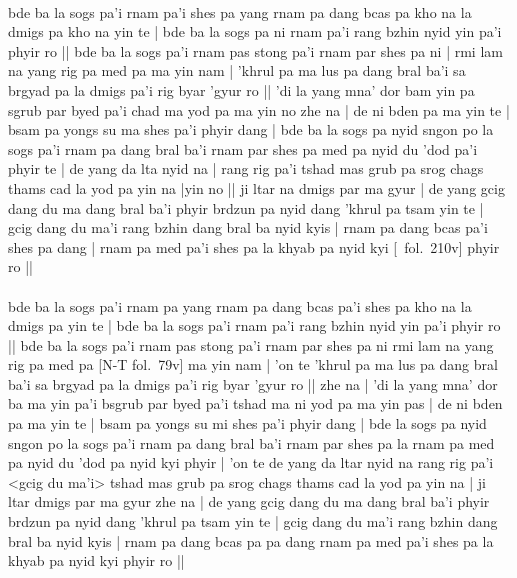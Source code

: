 \documentclass[12pt]{article}
\begin{document}
\textbf{\TVA}\\
bde ba la sogs pa'i rnam pa'i shes pa yang rnam pa dang bcas pa kho na la dmigs pa kho na yin te | bde ba la sogs pa ni rnam pa'i rang bzhin nyid yin pa'i phyir ro || bde ba la sogs pa'i rnam pas stong pa'i rnam par shes pa ni | rmi lam na yang rig pa med pa ma yin nam | 'khrul pa ma lus pa dang bral ba'i sa brgyad pa la dmigs pa'i rig byar 'gyur ro || 'di la yang mna' dor bam yin pa sgrub par byed pa'i chad ma yod pa ma yin no zhe na | de ni bden pa ma yin te | bsam pa yongs su ma shes pa'i phyir dang | bde ba la sogs pa nyid sngon po la sogs pa'i rnam pa dang bral ba'i rnam par shes pa med pa nyid du 'dod pa'i phyir te | de yang da lta nyid na | rang rig pa'i tshad mas grub pa srog chags thams cad la yod pa yin na |yin no || ji ltar na dmigs par ma gyur | de yang gcig dang du ma dang bral ba'i phyir brdzun pa nyid dang 'khrul pa tsam yin te | gcig dang du ma'i rang bzhin dang bral ba nyid kyis | rnam pa dang bcas pa'i shes pa dang | rnam pa med pa'i shes pa la khyab pa nyid kyi [\TVA\ fol.\ 210v] phyir ro ||\\

\textbf{\TVB}\\
bde ba la sogs pa'i rnam pa yang rnam pa dang bcas pa'i shes pa kho na la dmigs pa yin te | bde ba la sogs pa'i rnam pa'i rang bzhin nyid yin pa'i phyir ro || bde ba la sogs pa'i rnam pas stong pa'i rnam par shes pa ni rmi lam na yang rig pa med pa [N-T fol.\ 79v] ma yin nam | 'on te 'khrul pa ma lus pa dang bral ba'i sa brgyad pa la dmigs pa'i rig byar 'gyur ro || zhe na | 'di la yang mna' dor ba ma yin pa'i bsgrub par byed pa'i tshad ma ni yod pa ma yin pas | de ni bden pa ma yin te | bsam pa yongs su mi shes pa'i phyir dang | bde la sogs pa nyid sngon po la sogs pa'i rnam pa dang bral ba'i rnam par shes pa la rnam pa med pa nyid du 'dod pa nyid kyi phyir | 'on te de yang da ltar nyid na rang rig pa'i <gcig du ma'i> tshad mas grub pa srog chags thams cad la yod pa yin na | ji ltar dmigs par ma gyur zhe na | de yang gcig dang du ma dang bral ba'i phyir brdzun pa nyid dang 'khrul pa tsam yin te | gcig dang du ma'i rang bzhin dang bral ba nyid kyis | rnam pa dang bcas pa pa dang rnam pa med pa'i shes pa la khyab pa nyid kyi phyir ro ||\\ 
\end{document}
